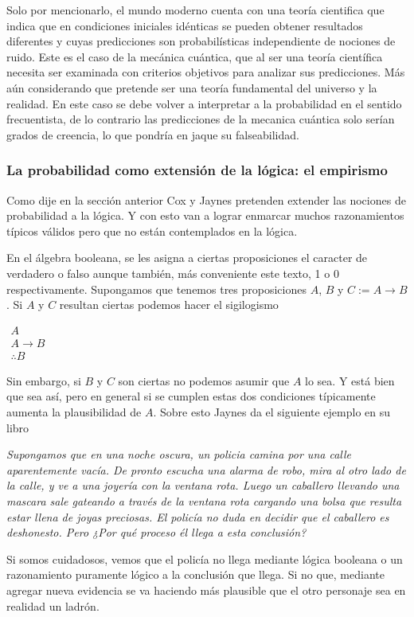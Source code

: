 Solo por mencionarlo, el mundo moderno cuenta con una teoría cientifica que indica que en condiciones iniciales idénticas se pueden obtener resultados diferentes y cuyas predicciones son probabilísticas independiente de nociones de ruido. Este es el caso de la mecánica cuántica, que al ser una teoría científica necesita ser examinada con criterios objetivos para analizar sus predicciones. Más aún considerando que pretende ser una teoría fundamental del universo y la realidad. En este caso se debe volver a interpretar a la probabilidad en el sentido frecuentista, de lo contrario las predicciones de la mecanica cuántica solo serían grados de creencia, lo que pondría en jaque su falseabilidad.

\subsubsection{La probabilidad como extensión de la lógica: el empirismo}
Como dije en la sección anterior Cox y Jaynes pretenden extender las nociones de probabilidad a la lógica. Y con esto van a lograr enmarcar muchos razonamientos típicos válidos pero que no están contemplados en la lógica.

En el álgebra booleana, se les asigna a ciertas proposiciones el caracter de verdadero o falso aunque también, más conveniente este texto, 1 o 0 respectivamente. Supongamos que tenemos tres proposiciones $A$, $B$ y $C := A\to B$. Si $A$ y $C$ resultan ciertas podemos hacer el sigilogismo
\begin{center}
    $\begin{array}{c}
        A \\
        A \to B \\
        \hline
        \therefore B
    \end{array}$
\end{center}
Sin embargo, si $B$ y $C$ son ciertas no podemos asumir que $A$ lo sea. Y está bien que sea así, pero en general si se cumplen estas dos condiciones típicamente aumenta la plausibilidad de $A$. Sobre esto Jaynes da el siguiente ejemplo en su libro
\begin{center}
    {\it
    Supongamos que en una noche oscura, un policia camina por una calle aparentemente vacía. De pronto escucha una alarma de robo, mira al otro lado de la calle, y ve a una joyería con la ventana rota. Luego un caballero llevando una mascara sale gateando a través de la ventana rota cargando una bolsa que resulta estar llena de joyas preciosas. El policía no duda en decidir que el caballero es deshonesto. Pero ¿Por qué proceso él llega a esta conclusión?
    }
\end{center}
Si somos cuidadosos, vemos que el policía no llega mediante lógica booleana o un razonamiento puramente lógico a la conclusión que llega. Si no que, mediante agregar nueva evidencia se va haciendo más plausible que el otro personaje sea en realidad un ladrón.

